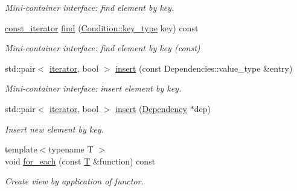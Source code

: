 \begin{DoxyCompactItemize}
\begin{DoxyCompactList}\small\item\em Mini-\/container interface\+: find element by key. \end{DoxyCompactList}\item 
\hyperlink{class_d_d4hep_1_1_conditions_1_1_conditions_dependency_collection_ab5e9bcdc3330c3b694303f627799dc84}{const\+\_\+iterator} \hyperlink{class_d_d4hep_1_1_conditions_1_1_conditions_dependency_collection_a17aa7289b666f323bcf5f077a60abad2}{find} (\hyperlink{class_d_d4hep_1_1_conditions_1_1_condition_a7528efa762e8cc072ef80ea67c3531f9}{Condition\+::key\+\_\+type} key) const
\begin{DoxyCompactList}\small\item\em Mini-\/container interface\+: find element by key (const) \end{DoxyCompactList}\item 
std\+::pair$<$ \hyperlink{class_d_d4hep_1_1_conditions_1_1_conditions_dependency_collection_a685a1a6841f2fa4d70ab9a9bfb7b0b6a}{iterator}, bool $>$ \hyperlink{class_d_d4hep_1_1_conditions_1_1_conditions_dependency_collection_a2135e9b1eb88d36301f88d9ef33a11a8}{insert} (const Dependencies\+::value\+\_\+type \&entry)
\begin{DoxyCompactList}\small\item\em Mini-\/container interface\+: insert element by key. \end{DoxyCompactList}\item 
std\+::pair$<$ \hyperlink{class_d_d4hep_1_1_conditions_1_1_conditions_dependency_collection_a685a1a6841f2fa4d70ab9a9bfb7b0b6a}{iterator}, bool $>$ \hyperlink{class_d_d4hep_1_1_conditions_1_1_conditions_dependency_collection_a2f8d2a2f72821fbf0c223f24b9b074af}{insert} (\hyperlink{class_d_d4hep_1_1_conditions_1_1_conditions_dependency_collection_a87252585d3e17ae82813c039b1b47e8a}{Dependency} $\ast$dep)
\begin{DoxyCompactList}\small\item\em Insert new element by key. \end{DoxyCompactList}\item 
{\footnotesize template$<$typename T $>$ }\\void \hyperlink{class_d_d4hep_1_1_conditions_1_1_conditions_dependency_collection_a796b0e2bce797326b441c3a0d05787f6}{for\+\_\+each} (const \hyperlink{class_t}{T} \&function) const
\begin{DoxyCompactList}\small\item\em Create view by application of functor. \end{DoxyCompactList}\end{DoxyCompactItemize}
